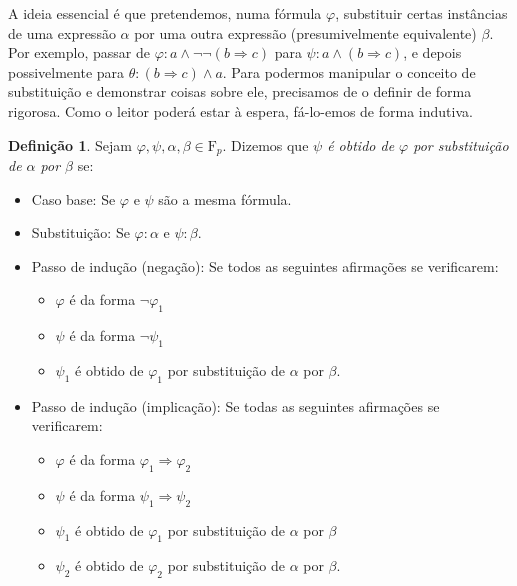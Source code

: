 \documentclass{report}
\theoremstyle{definition}
\newtheorem{definicao}{Definição}
\theoremstyle{remark}
\newcommand{\F}{\mathrm{F}}
\newcommand{\imply}{\mathbin{\Rightarrow}}
\begin{document}
	A ideia essencial é que pretendemos, numa fórmula $\varphi$, substituir certas instâncias de uma expressão $\alpha$ por uma outra expressão (presumivelmente equivalente) $\beta$. Por exemplo, passar de $\varphi : a \land \neg \neg (b \imply c)$ para $\psi : a \land (b \imply c)$, e depois possivelmente para $\theta : (b \imply c) \land a$. Para podermos manipular o conceito de substituição e demonstrar coisas sobre ele, precisamos de o definir de forma rigorosa. Como o leitor poderá estar à espera, fá-lo-emos de forma indutiva.
	
	\begin{definicao}\label{def:obtidaporsubstituicao}
	Sejam $\varphi, \psi, \alpha, \beta \in \F_p$. Dizemos que \emph{$\psi$ é obtido de $\varphi$ por substituição de $\alpha$ por $\beta$} se:
	
	\begin{itemize}
	\item Caso base: Se $\varphi$ e $\psi$ são a mesma fórmula.
	
	\item Substituição: Se $\varphi : \alpha$ e $\psi : \beta$.
	
	\item Passo de indução (negação): Se todos as seguintes afirmações se verificarem:
	\begin{itemize}
	\item $\varphi$ é da forma $\neg \varphi_1$
	
	\item $\psi$ é da forma $\neg \psi_1$
	
	\item $\psi_1$ é obtido de $\varphi_1$ por substituição de $\alpha$ por $\beta$.
	\end{itemize}
	
	\item Passo de indução (implicação): Se todas as seguintes afirmações se verificarem:
	\begin{itemize}
	\item $\varphi$ é da forma $\varphi_1 \imply \varphi_2$
	
	\item $\psi$ é da forma $\psi_1 \imply \psi_2$
	
	\item $\psi_1$ é obtido de $\varphi_1$ por substituição de $\alpha$ por $\beta$
	
	\item $\psi_2$ é obtido de $\varphi_2$ por substituição de $\alpha$ por $\beta$.
	\end{itemize}
	\end{itemize}
	\end{definicao}
	
\end{document}
